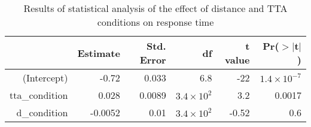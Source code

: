\begin{table*}[!h]
\centering
\caption{Results of statistical analysis of the effect of distance and TTA conditions on response time} 
\label{tab:RT}
\begin{tabular}{rrrrrr}
  \toprule
 & Estimate & Std. Error & df & t value & Pr($>$$|$t$|$) \\ 
  \midrule
(Intercept) & -0.72 & 0.033 & 6.8 & -22 & $1.4 \times 10^{-7}$ \\ 
  tta\_condition & 0.028 & 0.0089 & $3.4 \times 10^{2}$ & 3.2 & 0.0017 \\ 
  d\_condition & -0.0052 & 0.01 & $3.4 \times 10^{2}$ & -0.52 & 0.6 \\ 
   \bottomrule
\end{tabular}
\end{table*}
